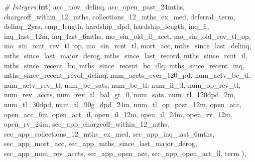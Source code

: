 \documentclass[11pt,]{report}
\newenvironment{Shaded}{\begin{snugshade}}{\end{snugshade}}
\newcommand{\CommentTok}[1]{\textcolor[rgb]{0.56,0.35,0.01}{\textit{#1}}}
\newcommand{\DecValTok}[1]{\textcolor[rgb]{0.00,0.00,0.81}{#1}}
\newcommand{\KeywordTok}[1]{\textcolor[rgb]{0.13,0.29,0.53}{\textbf{#1}}}
\newcommand{\NormalTok}[1]{#1}
\begin{document}
\begin{Shaded}
\begin{Highlighting}[numbers=left,,]
{{{{      \CommentTok{# Integers}
      \KeywordTok{int}\NormalTok{(}
\NormalTok{        acc_now_delinq,}
\NormalTok{        acc_open_past_24mths,}
\NormalTok{        chargeoff_within_}\DecValTok{12}\NormalTok{_mths,}
\NormalTok{        collections_}\DecValTok{12}\NormalTok{_mths_ex_med,}
\NormalTok{        deferral_term,}
\NormalTok{        delinq_2yrs,}
\NormalTok{        emp_length,}
\NormalTok{        hardship_dpd,}
\NormalTok{        hardship_length,}
\NormalTok{        inq_fi,}
\NormalTok{        inq_last_12m,}
\NormalTok{        inq_last_6mths,}
\NormalTok{        mo_sin_old_il_acct,}
\NormalTok{        mo_sin_old_rev_tl_op,}
\NormalTok{        mo_sin_rcnt_rev_tl_op,}
\NormalTok{        mo_sin_rcnt_tl,}
\NormalTok{        mort_acc,}
\NormalTok{        mths_since_last_delinq,}
\NormalTok{        mths_since_last_major_derog,}
\NormalTok{        mths_since_last_record,}
\NormalTok{        mths_since_rcnt_il,}
\NormalTok{        mths_since_recent_bc,}
\NormalTok{        mths_since_recent_bc_dlq,}
\NormalTok{        mths_since_recent_inq,}
\NormalTok{        mths_since_recent_revol_delinq,}
\NormalTok{        num_accts_ever_}\DecValTok{120}\NormalTok{_pd,}
\NormalTok{        num_actv_bc_tl,}
\NormalTok{        num_actv_rev_tl,}
\NormalTok{        num_bc_sats,}
\NormalTok{        num_bc_tl,}
\NormalTok{        num_il_tl,}
\NormalTok{        num_op_rev_tl,}
\NormalTok{        num_rev_accts,}
\NormalTok{        num_rev_tl_bal_gt_}\DecValTok{0}\NormalTok{,}
\NormalTok{        num_sats,}
\NormalTok{        num_tl_120dpd_2m,}
\NormalTok{        num_tl_30dpd,}
\NormalTok{        num_tl_90g_dpd_24m,}
\NormalTok{        num_tl_op_past_12m,}
\NormalTok{        open_acc,}
\NormalTok{        open_acc_6m,}
\NormalTok{        open_act_il,}
\NormalTok{        open_il_12m,}
\NormalTok{        open_il_24m,}
\NormalTok{        open_rv_12m,}
\NormalTok{        open_rv_24m,}
\NormalTok{        sec_app_chargeoff_within_}\DecValTok{12}\NormalTok{_mths,}
\NormalTok{        sec_app_collections_}\DecValTok{12}\NormalTok{_mths_ex_med,}
\NormalTok{        sec_app_inq_last_6mths,}
\NormalTok{        sec_app_mort_acc,}
\NormalTok{        sec_app_mths_since_last_major_derog,}
\NormalTok{        sec_app_num_rev_accts,}
\NormalTok{        sec_app_open_acc,}
\NormalTok{        sec_app_open_act_il,}
\NormalTok{        term}
\NormalTok{      ),}
      
}}}}
\end{Highlighting}
\end{Shaded}
\end{document}
